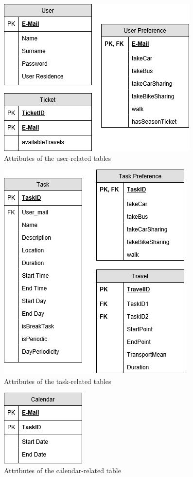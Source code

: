 \begin{figure}[H]
    \centering
    \includegraphics[scale=0.6]{Pictures/DatabaseDiagrams/UserRelatedTables.png}
    \caption{Attributes of the user-related tables}
\end{figure}

\begin{figure}[H]
    \centering
    \includegraphics[scale=0.6]{Pictures/DatabaseDiagrams/TaskRelatedTables.png}
    \caption{Attributes of the task-related tables}
\end{figure}

\begin{figure}[H]
    \centering
    \includegraphics[scale=0.6]{Pictures/DatabaseDiagrams/CalendarRelatedTable.png}
    \caption{Attributes of the calendar-related table}
\end{figure}
